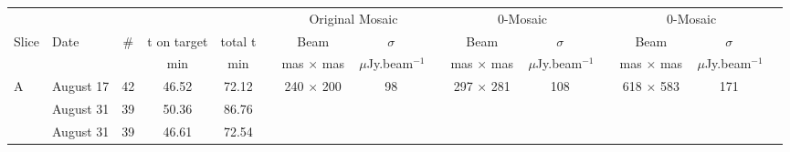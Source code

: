 \documentclass[longauth]{aa}
\begin{document}
\begin{table*}\footnotesize    
\centering          
\begin{tabular}{l l c c c c c c c c c c c c c}   
\hline     
\rule{0pt}{2.5ex}&   &  &  &  & & \multicolumn{2}{c}{Original Mosaic} & &\multicolumn{2}{c}{0\arcsec29-Mosaic} &  &\multicolumn{2}{c}{0\arcsec60-Mosaic}\\
\cline{7-8} \cline{10-11} \cline{13-14}
\rule{0pt}{2.5ex}Slice & Date  & \# & t on target & total t & & Beam & $\sigma$ & & Beam  & $\sigma$ & & Beam  & $\sigma$ \\
&&&{\tiny min} & {\tiny min} & & {\tiny mas$\,\times\,$mas} & {\tiny\,$\mu$Jy.beam$^{-1}$} & &{\tiny mas$\,\times\,$mas} & {\tiny\,$\mu$Jy.beam$^{-1}$} & & {\tiny mas$\,\times\,$mas} & {\tiny\,$\mu$Jy.beam$^{-1}$}\\
\hline
\hline
\multirow{3}{*}{A}  &August 17  &42 & 46.52& 72.12 & & \multirow{3}{*}{240$\,\times\,$200} & \multirow{3}{*}{98} & & \multirow{3}{*}{297$\,\times\,$281} & \multirow{3}{*}{108}&  & \multirow{3}{*}{618$\,\times\,$583} & \multirow{3}{*}{171}\\
&August 31  &39 & 50.36& 86.76 \\ 
& August 31  &39 & 46.61& 72.54 \\ 


\end{tabular}
\end{table*}
\end{document}
